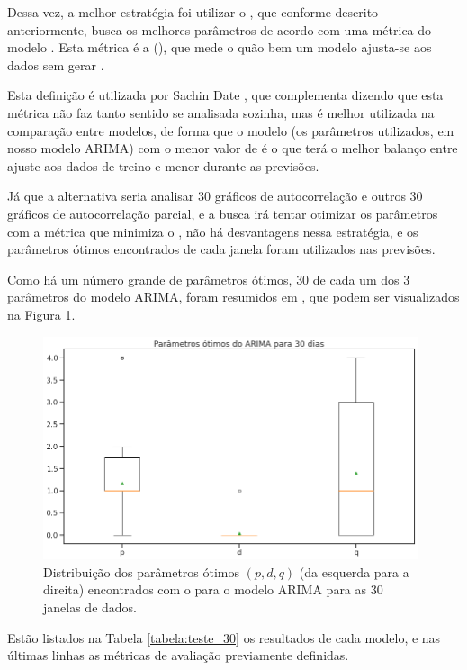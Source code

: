 Dessa vez, a melhor estratégia foi utilizar o , que conforme descrito anteriormente, busca os melhores parâmetros de acordo com uma métrica do modelo . Esta métrica é a  (), que mede o quão bem um modelo ajusta-se aos dados sem gerar .

Esta definição é utilizada por Sachin Date \citep{aic}, que complementa dizendo que esta métrica não faz tanto sentido se analisada sozinha, mas é melhor utilizada na comparação entre modelos, de forma que o modelo (os parâmetros utilizados, em nosso modelo ARIMA) com o menor valor de  é o que terá o melhor balanço entre ajuste aos dados de treino e menor  durante as previsões.

Já que a alternativa seria analisar $30$ gráficos de autocorrelação e outros $30$ gráficos de autocorrelação parcial, e a busca irá tentar otimizar os parâmetros com a métrica que minimiza o , não há desvantagens nessa estratégia, e os parâmetros ótimos encontrados de cada janela foram utilizados nas previsões.

Como há um número grande de parâmetros ótimos, $30$ de cada um dos $3$ parâmetros do modelo ARIMA, foram resumidos em , que podem ser visualizados na Figura \ref{fig:arima_boxplot_30}.

\begin{figure}[htb]
\centering
\includegraphics[width=11cm]{figuras/arima_boxplot_30}
\caption{Distribuição dos parâmetros ótimos $(p, d, q)$ (da esquerda para a direita) encontrados com o  para o modelo ARIMA para as $30$ janelas de dados.}
\label{fig:arima_boxplot_30}
\end{figure}

Estão listados na Tabela \ref{tabela:teste_30} os resultados de cada modelo, e nas últimas linhas as métricas de avaliação previamente definidas.

